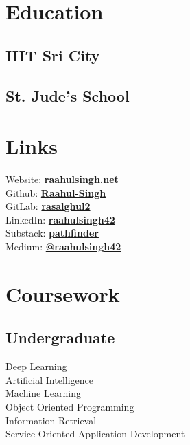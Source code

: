 \documentclass[]{raahul_singh_resume}
\begin{document}

\begin{minipage}[t]{0.33\textwidth} 

\section{Education} 

\subsection{IIIT Sri City}
\sectionsep

\subsection{St. Jude's School}
\sectionsep

\section{Links} 
Website: \href{https://raahulsingh.net}{\bf raahulsingh.net} \\
Github: \href{https://github.com/Raahul-Singh}{\bf Raahul-Singh} \\
GitLab:  \href{https://gitlab.com/rasalghul2}{\bf rasalghul2} \\
LinkedIn:  \href{https://linkedin.com/in/raahulsingh42}{\bf raahulsingh42} \\
Substack:  \href{https://raahulsingh.substack.com}{\bf pathfinder} \\
Medium:  \href{https://medium.com/@_hawks_}{\bf @raahulsingh42} \\

\section{Coursework}
\subsection{Undergraduate}
\textbullet{}Deep Learning \\
\textbullet{}Artificial Intelligence \\
\textbullet{}Machine Learning \\
\textbullet{}Object Oriented Programming \\
\textbullet{}Information Retrieval \\
\textbullet{}Service Oriented Application Development  \\
\sectionsep


\end{minipage}
\end{document}
